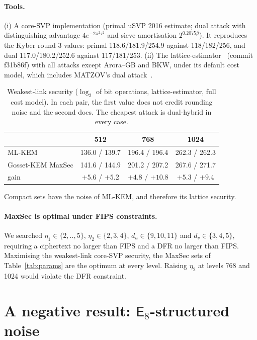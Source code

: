 \documentclass[11pt,a4paper]{article}
\theoremstyle{definition}
\theoremstyle{remark}
\newcommand{\E}{\mathsf{E}_8}
\newcommand{\lt}{\log_2}
\begin{document}
\paragraph{Tools.} (i) A core-SVP implementation (primal uSVP 2016 estimate; dual attack with distinguishing advantage $4e^{-2\pi^2\tau^2}$ and sieve amortisation $2^{0.2075\beta}$). It reproduces the Kyber round-3 values: primal 118.6/181.9/254.9 against 118/182/256, and dual 117.0/180.2/252.6 against 117/181/253. (ii) The lattice-estimator~\cite{estimator} (commit f31b86f) with all attacks except Arora--GB and BKW, under its default cost model, which includes MATZOV's dual attack~\cite{matzov}.

\begin{table}[t]\centering\small
\caption{Weakest-link security ($\lt$ of bit operations, lattice-estimator, full cost model). In each pair, the first value does not credit rounding noise and the second does. The cheapest attack is dual-hybrid in every case.}\label{tab:est}
\begin{tabular}{lccc}\toprule
& 512 & 768 & 1024\\\midrule
ML-KEM & 136.0 / 139.7 & 196.4 / 196.4 & 262.3 / 262.3\\
Gosset-KEM MaxSec & 141.6 / 144.9 & 201.2 / 207.2 & 267.6 / 271.7\\
gain & $+5.6$ / $+5.2$ & $+4.8$ / $+10.8$ & $+5.3$ / $+9.4$\\\bottomrule
\end{tabular}
\end{table}

Compact sets have the noise of ML-KEM, and therefore its lattice security.

\paragraph{MaxSec is optimal under FIPS constraints.} We searched $\eta_1\in\{2,..,5\}$, $\eta_2\in\{2,3,4\}$, $d_u\in\{9,10,11\}$ and $d_v\in\{3,4,5\}$, requiring a ciphertext no larger than FIPS and a DFR no larger than FIPS. Maximising the weakest-link core-SVP security, the MaxSec sets of Table~\ref{tab:params} are the optimum at every level. Raising $\eta_2$ at levels 768 and 1024 would violate the DFR constraint.

\section{A negative result: $\E$-structured noise}\label{sec:negative}
\end{document}
